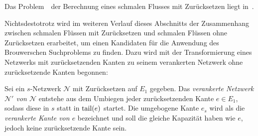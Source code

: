 \begin{conjecture}
	Das Problem~\probTFwR\ der Berechnung eines schmalen Flusses mit Zurücksetzen liegt in~\PPAD.
\end{conjecture}

Nichtsdestotrotz wird im weiteren Verlauf dieses Abschnitts der Zusammenhang zwischen schmalen Flüssen mit Zurücksetzen und schmalen Flüssen ohne Zurücksetzen erarbeitet, um einen Kandidaten für die Anwendung des Brouwerschen Suchproblems zu finden.
Dazu wird mit der Transformierung eines Netzwerks mit zurücksetzenden Kanten zu seinem verankerten Netzwerk ohne zurücksetzende Kanten begonnen:

\begin{definition}
	Sei ein $s$-Netzwerk $\mathcal{N}$ mit Zurücksetzen auf $E_1$ gegeben.
	Das \emph{verankerte Netzwerk $\mathcal{N}'$ von $\mathcal{N}$} entstehe aus dem Umbiegen jeder zurücksetzenden Kante $e\in E_1$, sodass diese in $s$ statt in $\operatorname{tail}(e)$ startet.
	Die umgebogene Kante $e_s$ wird als die \emph{verankerte Kante von $e$} bezeichnet und soll die gleiche Kapazität haben wie $e$, jedoch keine zurücksetzende Kante sein.
\end{definition}

